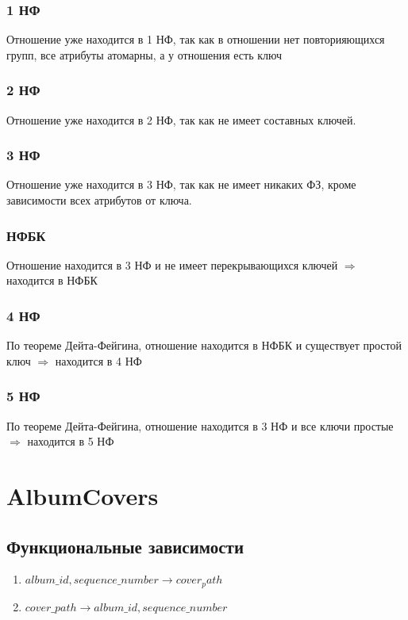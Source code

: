 \documentclass{article}
\begin{document}
\subsubsection{1 НФ}

Отношение уже находится в 1 НФ, так как в отношении нет повторияющихся групп, все атрибуты атомарны, а у отношения есть ключ

\subsubsection{2 НФ}

Отношение уже находится в 2 НФ, так как не имеет составных ключей.

\subsubsection{3 НФ}

Отношение уже находится в 3 НФ, так как не имеет никаких ФЗ, кроме зависимости всех атрибутов от ключа.

\subsubsection{НФБК}

Отношение находится в 3 НФ и не имеет перекрывающихся ключей $\Rightarrow$ находится в НФБК

\subsubsection{4 НФ}

По теореме Дейта-Фейгина, отношение находится в НФБК и существует простой ключ $\Rightarrow$ находится в 4 НФ

\subsubsection{5 НФ}

По теореме Дейта-Фейгина, отношение находится в 3 НФ и все ключи простые $\Rightarrow$ находится в 5 НФ


\section{AlbumCovers}

\subsection{Функциональные зависимости}
\begin{enumerate}
	\item $album\_id, sequence\_number \rightarrow cover_path$
	\item $cover\_path \rightarrow album\_id, sequence\_number$
\end{enumerate}
\end{document}
